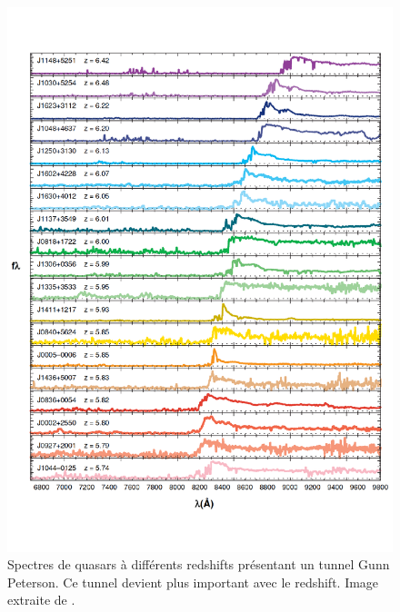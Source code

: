 
\begin{figure}
        \includegraphics[width=.95\linewidth]{img/01/quasar_spectre.pdf} 
        \caption[Spectres de quasars]{Spectres de quasars à différents redshifts présentant un tunnel Gunn Peterson.
        Ce tunnel devient plus important avec le redshift.
		Image extraite de \cite{fan_constraining_2006}.
 		\label{fig:spectre_quasar}}
\end{figure}



